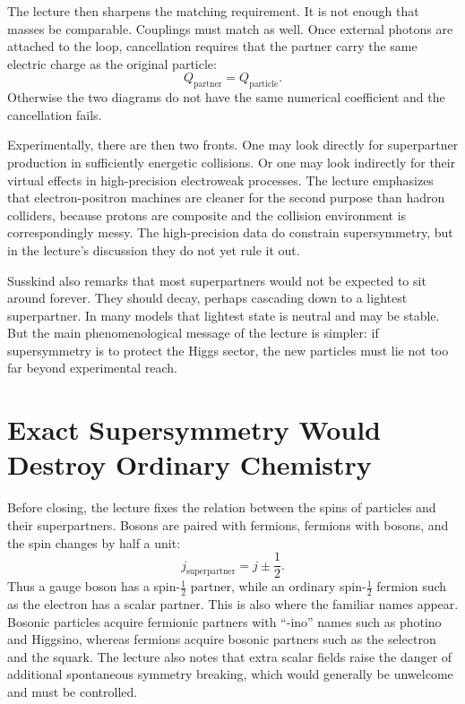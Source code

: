 The lecture then sharpens the matching requirement. It is not enough that masses be comparable. Couplings must match as well. Once external photons are attached to the loop, cancellation requires that the partner carry the same electric charge as the original particle:
\begin{equation}
Q_{\text{partner}}=Q_{\text{particle}}.
\end{equation}
Otherwise the two diagrams do not have the same numerical coefficient and the cancellation fails.

Experimentally, there are then two fronts. One may look directly for superpartner production in sufficiently energetic collisions. Or one may look indirectly for their virtual effects in high-precision electroweak processes. The lecture emphasizes that electron-positron machines are cleaner for the second purpose than hadron colliders, because protons are composite and the collision environment is correspondingly messy. The high-precision data do constrain supersymmetry, but in the lecture's discussion they do not yet rule it out.

Susskind also remarks that most superpartners would not be expected to sit around forever. They should decay, perhaps cascading down to a lightest superpartner. In many models that lightest state is neutral and may be stable. But the main phenomenological message of the lecture is simpler: if supersymmetry is to protect the Higgs sector, the new particles must lie not too far beyond experimental reach.

\section{Exact Supersymmetry Would Destroy Ordinary Chemistry}

Before closing, the lecture fixes the relation between the spins of particles and their superpartners. Bosons are paired with fermions, fermions with bosons, and the spin changes by half a unit:
\begin{equation}
j_{\text{superpartner}}=j\pm\frac{1}{2}.
\end{equation}
Thus a gauge boson has a spin-\(\tfrac12\) partner, while an ordinary spin-\(\tfrac12\) fermion such as the electron has a scalar partner. This is also where the familiar names appear. Bosonic particles acquire fermionic partners with ``-ino'' names such as photino and Higgsino, whereas fermions acquire bosonic partners such as the selectron and the squark. The lecture also notes that extra scalar fields raise the danger of additional spontaneous symmetry breaking, which would generally be unwelcome and must be controlled.

